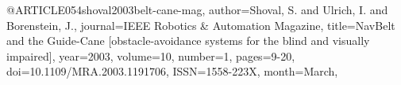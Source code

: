 @ARTICLE{054shoval2003belt-cane-mag,
author={Shoval, S. and Ulrich, I. and Borenstein, J.},
journal={IEEE Robotics \& Automation Magazine}, 
title={NavBelt and the Guide-Cane [obstacle-avoidance systems for the blind and visually impaired]}, 
year={2003},
volume={10},
number={1},
pages={9-20},
doi={10.1109/MRA.2003.1191706},
ISSN={1558-223X},
month={March},}